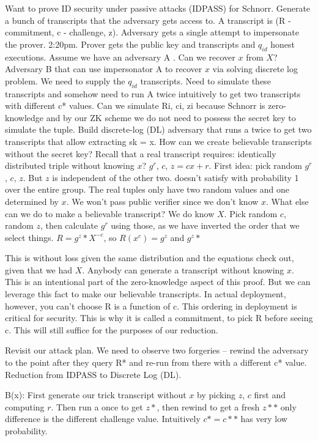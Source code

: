 Want to prove ID security under passive attacks (IDPASS) for Schnorr. Generate a bunch of transcripts that the adversary gets access to. A transcript is (R - commitment, c - challenge, z). Adversary gets a single attempt to impersonate the prover. 2:20pm. Prover gets the public key and transcripts and $q_{id}$ honest executions. Assume we have an adversary A . Can we recover $x$ from $X$? Adversary B that can use impersonator A to recover $x$ via solving discrete log problem. We need to supply the $q_{id}$ transcripts. Need to simulate these transcripts and somehow need to run A twice intuitively to get two transcripts with different c* values. Can we simulate Ri, ci, zi because Schnorr is zero-knowledge and by our ZK scheme we do not need to possess the secret key to simulate the tuple. Build discrete-log (DL) adversary that runs a twice to get two transcripts that allow extracting sk = x.
How can we create believable transcripts without the secret key? 
Recall that a real transcript requires:
identically distributed triple without knowing $x$?
$g^r$, $c$, $z = cx + r$.
First idea: pick random $g^r$, $c$, $z$. But $z$ is independent of the other two. doesn't satisfy with probability 1 over the entire group. 
The real tuples only have two random values and one determined by $x$. We won't pass public verifier since we don't know $x$.
What else can we do to make a believable transcript? We do know $X$. Pick random $c$, random $z$, then calculate $g^r$ using those, as we have inverted the order that we select things.
$R = g^z * X^{-c}$, so $R(x^c) = g^z$ and $g^z * $

This is without loss given the same distribution and the equations check out, given that we had $X$. Anybody can generate a transcript without knowing $x$. This is an intentional part of the zero-knowledge aspect of this proof. But we can leverage this fact to make our believable transcripts. In actual deployment, however, you can't choose R is a function of c. This ordering in deployment is critical for security. This is why it is called a commitment, to pick R before seeing c. This will still suffice for the purposes of our reduction.

Revisit our attack plan. We need to observe two forgeries -- rewind the adversary to the point after they query R* and re-run from there with a different c* value.
Reduction from IDPASS to Discrete Log (DL).

B(x):
First generate our trick transcript without $x$ by picking $z$, $c$ first and computing $r$. Then run a once to get $z*$, then rewind to get a fresh $z**$ only difference is the different challenge value. Intuitively $c*=c**$ has very low probability. 

